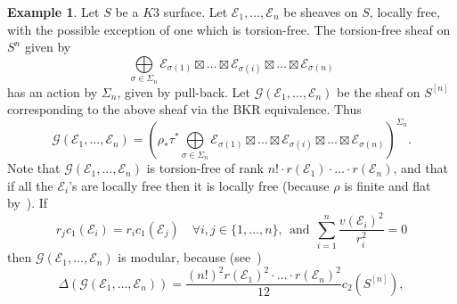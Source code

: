 \documentclass[11pt]{amsart}
\let\mathcal\mathscr
\def\cE{\mathcal{E}}
\def\cG{\mathcal{G}}
\theoremstyle{definition}
\newtheorem{expl}[lmm]{Example}
\theoremstyle{remark}
\begin{document}
\begin{expl}\label{expl:moltimoduli}
%
Let $S$ be a $K3$ surface. Let $\cE_1,\ldots,\cE_n$ be  sheaves on $S$, locally free, with the possible exception of one which is torsion-free. 
  The torsion-free sheaf on $S^n$ given by
%
\begin{equation*}
%
\bigoplus\limits_{\sigma\in\Sigma_n}\cE_{\sigma(1)}\boxtimes\ldots\boxtimes
\cE_{\sigma(i)}\boxtimes\ldots\boxtimes\cE_{\sigma(n)}
%
\end{equation*}
% 
  has an action by $\Sigma_n$, given by pull-back. Let $\cG(\cE_1,\ldots,\cE_n)$ be the sheaf on $S^{[n]}$ corresponding to the above sheaf via the BKR equivalence. Thus
\begin{equation}\label{gieunoedue}
%
\cG(\cE_1,\ldots,\cE_n)=\left(\rho_{*}\tau^{*}\bigoplus\limits_{\sigma\in\Sigma_n}\cE_{\sigma(1)}\boxtimes\ldots\boxtimes
\cE_{\sigma(i)}\boxtimes\ldots\boxtimes\cE_{\sigma(n)}\right)^{\Sigma_n}. 
%
\end{equation}
% 
Note that $\cG(\cE_1,\ldots,\cE_n)$  is torsion-free of rank $n!\cdot r(\cE_1)\cdot\ldots\cdot r(\cE_n)$, and that  if all the $\cE_i$'s are locally free then  
it is  locally free (because 
 $\rho$ is finite and flat by~\cite[Thm.~3.1]{haiman:polygraphs}).  If
\begin{equation}\label{giusteipotesi}
%
r_j c_1(\cE_i)=r_i c_1(\cE_j)\quad \forall i,j\in\{1,\ldots,n\},\ \ \text{and}
\ \  \sum_{i=1}^n  \frac{v(\cE_i)^2}{r_i^2}=0
%
\end{equation}
%
then $\cG(\cE_1,\ldots,\cE_n)$ is modular, because (see~\cite[Prop.~2.7,Rmk~2.10]{og:highdim}) 
%
\begin{equation}\label{discingen}
%
\Delta(\cG(\cE_1,\ldots,\cE_n))  =  \frac{(n!)^2 r(\cE_1)^2\cdot\ldots\cdot r(\cE_n)^2}{12} c_2(S^{[n]}),
%
\end{equation}
%
%
\end{expl}
%
%
\end{document}
